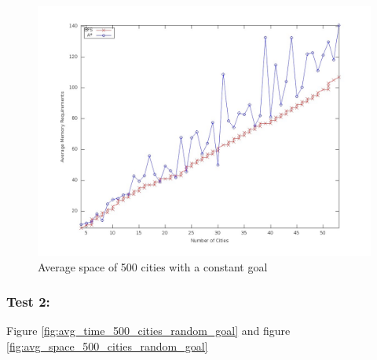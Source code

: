 \documentclass[letterpaper]{article}
\begin{document}
\begin{figure}[!htb]
	\centering
	\includegraphics[scale=0.22]{./pics/avg_space_500_cities_constant_goal.jpg}
	\caption{Average space of 500 cities with a constant goal}
	\label{fig:avg_space_500_cities_constant_goal}
\end{figure}

\subsubsection{Test 2:}
Figure \ref{fig:avg_time_500_cities_random_goal} and figure \ref{fig:avg_space_500_cities_random_goal}
\end{document}
